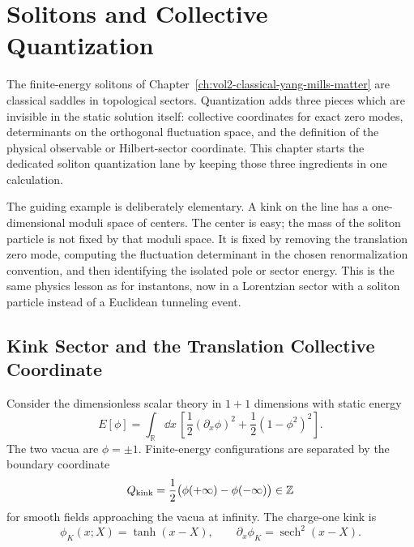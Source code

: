 \chapter{Solitons and Collective Quantization}
\label{ch:solitons-collective-quantization}
\ConventionsLorentzian

The finite-energy solitons of
Chapter~\ref{ch:vol2-classical-yang-mills-matter} are classical saddles in
topological sectors.  Quantization adds three pieces which are invisible in
the static solution itself: collective coordinates for exact zero modes,
determinants on the orthogonal fluctuation space, and the definition of the
physical observable or Hilbert-sector coordinate.  This chapter starts the
dedicated soliton quantization lane by keeping those three ingredients in one
calculation.

The guiding example is deliberately elementary.  A kink on the line has a
one-dimensional moduli space of centers.  The center is easy; the mass of the
soliton particle is not fixed by that moduli space.  It is fixed by removing
the translation zero mode, computing the fluctuation determinant in the
chosen renormalization convention, and then identifying the isolated pole or
sector energy.  This is the same physics lesson as for instantons, now in a
Lorentzian sector with a soliton particle instead of a Euclidean tunneling
event.

\section{Kink Sector and the Translation Collective Coordinate}
\label{sec:kink-sector-translation-collective-coordinate}

Consider the dimensionless scalar theory in \(1+1\) dimensions with static
energy
\begin{equation}
  E[\phi]
  =
  \int_{\mathbb R}\dd x\,
  \left[
    \frac12(\partial_x\phi)^2
    +\frac12(1-\phi^2)^2
  \right].
  \label{eq:phi4-kink-static-energy}
\end{equation}
The two vacua are \(\phi=\pm1\).  Finite-energy configurations are separated
by the boundary coordinate
\[
  Q_{\rm kink}
  =
  \frac12\bigl(\phi(+\infty)-\phi(-\infty)\bigr)\in\mathbb Z
\]
for smooth fields approaching the vacua at infinity.  The charge-one kink is
\begin{equation}
  \phi_K(x;X)=\tanh(x-X),
  \qquad
  \partial_x\phi_K=\operatorname{sech}^2(x-X).
  \label{eq:phi4-kink-profile}
\end{equation}

